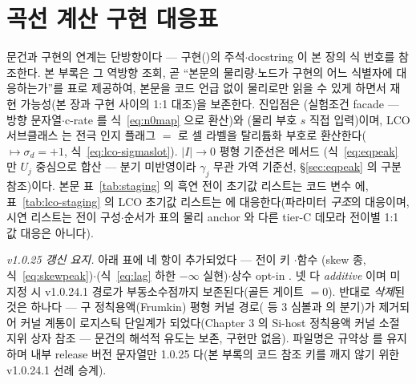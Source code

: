 \section{곡선 계산 구현 대응표}\label{sec:appendix-code}
문건과 구현의 연계는 단방향이다 --- 구현()의 주석$\cdot$docstring 이 본 장의 식 번호를 참조한다. 본 부록은 그 역방향 조회, 곧 ``본문의 물리량$\cdot$노드가 구현의 어느 식별자에
대응하는가''를 표로 제공하여, 본문을 코드 언급 없이 물리로만 읽을 수 있게 하면서 재현 가능성(본 장과
구현 사이의 1:1 대조)을 보존한다. 진입점은 (실험조건 facade --- 방향 문자열$\cdot$c-rate 를
식~\eqref{eq:n0map} 으로 환산)와 (물리 부호 $s$ 직접 입력)이며, LCO 서브클래스
 는 전극 인지 플래그 $=$ 로 셀 라벨을
탈리튬화 부호로 환산한다($\mapsto\sigma_d{=}+1$, 식~\eqref{eq:lco-sigmaslot}). $|I|\to0$
평형 기준선은 메서드 (식~\eqref{eq:eqpeak} 만 $U_j$ 중심으로 합산 --- 분기
미반영이라 $\gamma_j$ 무관 가역 기준선, \S\ref{sec:eqpeak} 의 구분 참조)이다. 본문 표~\ref{tab:staging} 의
흑연 전이 초기값 리스트는 코드 변수  에, 표~\ref{tab:lco-staging} 의 LCO
초기값 리스트는  에 대응한다(파라미터 \emph{구조}의 대응이며, 
시연 리스트는 전이 구성$\cdot$순서가 표의 물리 anchor 와 다른 tier-C 데모라 전이별 1:1 값 대응은 아니다).

\emph{v1.0.25 갱신 요지.} 아래 표에 네 항이 추가되었다 --- 전이 키 $\cdot$함수
(skew 종, 식~\eqref{eq:skewpeak})$\cdot$(식~\eqref{eq:lag} 하한
$-\infty$ 실현)$\cdot$상수 opt-in . 넷 다 \emph{additive} 이며 미지정 시 v1.0.24.1
경로가 부동소수점까지 보존된다(골든 게이트 $=0$). 반대로 \emph{삭제}된 것은 하나다 --- 구
정칙용액(Frumkin) 평형 커널 경로( 등 3 심볼과  의 
분기)가 제거되어 커널 계통이 로지스틱 단일계가 되었다(Chapter 3 의 Si-host 정칙용액 커널 소절 지위 상자
참조 --- 문건의 해석적 유도는 보존, 구현만 없음). 파일명은 규약상  를 유지하며
내부 release 버전 문자열만 1.0.25 다(본 부록의 코드 참조 키를 깨지 않기 위한 v1.0.24.1 선례 승계).


